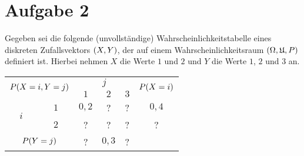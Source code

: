 \documentclass{exercise}
\begin{document}
    \section*{Aufgabe 2}
    
    \begin{problem}
        Gegeben sei die folgende (unvollständige) Wahrscheinlichkeitstabelle eines diskreten Zufallsvektors \(\parentheses*{X, Y}\), der auf einem Wahrscheinlichkeitsraum \(\parentheses*{\Omega, \mathfrak{U}, P}\) definiert ist.
        Hierbei nehmen \(X\) die Werte \(1\) und \(2\) und \(Y\) die Werte \(1\), \(2\) und \(3\) an.
        \begin{center}
            \begin{tabular}{cc|ccc|c}
                \toprule
                \multicolumn{2}{c|}{\multirow{2}{*}{\(P\parentheses*{X = i, Y = j}\)}} & \multicolumn{3}{c|}{\(j\)} & \multirow{2}{*}{\(P\parentheses*{X = i}\)}\\
                \multicolumn{2}{c|}{} & \(1\) & \(2\) & \(3\) &\\
                \midrule
                \multirow{2}{*}{\(i\)} & \(1\) & \(0,2\) & ? & ? & \(0,4\)\\
                & \(2\) & ? & ? & ? & ?\\
                \midrule
                \multicolumn{2}{c|}{\(P\parentheses*{Y = j}\)} & ? & \(0,3\) & ? &\\
                \bottomrule
            \end{tabular}
        \end{center}
    \end{problem}
    
\end{document}
